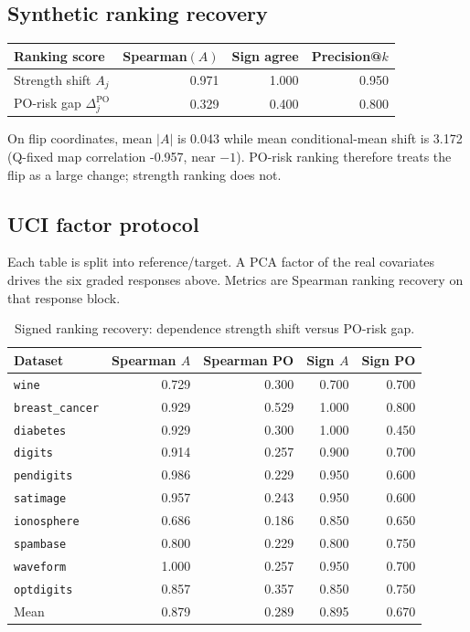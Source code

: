 \documentclass[11pt]{article}
\begin{document}
\subsection*{Synthetic ranking recovery}

\begin{center}
\begin{tabular}{lrrr}
\toprule
Ranking score & Spearman$(A)$ & Sign agree & Precision@$k$ \\
\midrule
Strength shift $A_j$ & 0.971 & 1.000 & 0.950 \\
PO-risk gap $\Delta^{\mathrm{PO}}_j$ & 0.329 & 0.400 & 0.800 \\
\bottomrule
\end{tabular}
\end{center}

On flip coordinates, mean $|A|$ is 0.043 while mean conditional-mean shift is 3.172
(Q-fixed map correlation -0.957, near $-1$).
PO-risk ranking therefore treats the flip as a large change; strength ranking does not.

\subsection*{UCI factor protocol}

Each table is split into reference/target. A PCA factor of the real covariates drives the six
graded responses above. Metrics are Spearman ranking recovery on that response block.

\begin{table}[h]
\centering
\caption{Signed ranking recovery: dependence strength shift versus PO-risk gap.}
\label{tab:dss-vs-porisk}
\begin{tabular}{lrrrr}
\toprule
Dataset & Spearman $A$ & Spearman PO & Sign $A$ & Sign PO \\
\midrule
\texttt{wine} & 0.729 & 0.300 & 0.700 & 0.700 \\
\texttt{breast\_cancer} & 0.929 & 0.529 & 1.000 & 0.800 \\
\texttt{diabetes} & 0.929 & 0.300 & 1.000 & 0.450 \\
\texttt{digits} & 0.914 & 0.257 & 0.900 & 0.700 \\
\texttt{pendigits} & 0.986 & 0.229 & 0.950 & 0.600 \\
\texttt{satimage} & 0.957 & 0.243 & 0.950 & 0.600 \\
\texttt{ionosphere} & 0.686 & 0.186 & 0.850 & 0.650 \\
\texttt{spambase} & 0.800 & 0.229 & 0.800 & 0.750 \\
\texttt{waveform} & 1.000 & 0.257 & 0.950 & 0.700 \\
\texttt{optdigits} & 0.857 & 0.357 & 0.850 & 0.750 \\
\midrule
Mean & 0.879 & 0.289 & 0.895 & 0.670 \\
\bottomrule
\end{tabular}
\end{table}
\end{document}
